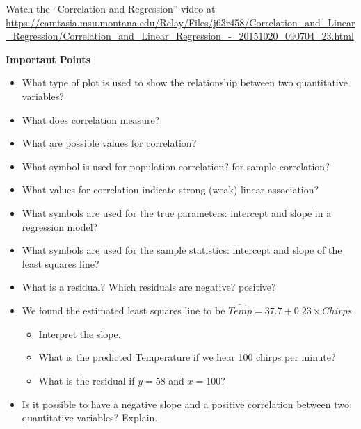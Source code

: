 \def\theTopic{Reading 15}


Watch the ``Correlation and Regression'' video at 
\url{https://camtasia.msu.montana.edu/Relay/Files/j63r458/Correlation_and_Linear_Regression/Correlation_and_Linear_Regression_-_20151020_090704_23.html }
\large
\begin{center}
  {\bf Important Points}
\end{center}

\begin{itemize}
\item What type of plot is used to show the relationship between two
  quantitative variables?\vspace{2cm}
\item What does correlation measure?\vspace{2cm}
\item What are possible values for correlation?  \vspace{2cm}
\item What symbol is used for population correlation?  for sample
  correlation? \vspace{2cm}  
\item What values for correlation indicate strong (weak) linear
  association?\vspace{2cm} 
\item  What symbols are used for the true parameters: intercept and
  slope in a regression model?\vspace{2cm}
\item  What symbols are used for the sample statistics: intercept and
  slope of the least squares line? \vspace{2cm}
\item  What is a residual? Which residuals are negative? positive?\vspace{2cm}
\item  We found the estimated least squares line to be
      $\widehat{Temp} = 37.7 +  0.23\times{Chirps}$ 
      \begin{itemize}
      \item Interpret the slope.\vspace{2cm}
      \item What is the predicted Temperature if we hear 100 chirps per
        minute? \vspace{2cm}
      \item What is the residual if $y = 58$ and $x =
        100$?\vspace{2cm}  
      \end{itemize}
\item Is it possible to have a negative slope and a positive
  correlation between two quantitative variables? Explain.\vspace*{\fill}
\end{itemize}
\normalsize